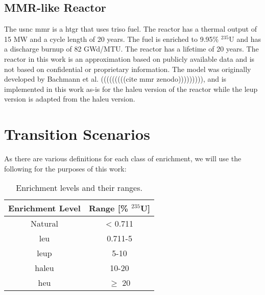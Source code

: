 \subsection{MMR-like Reactor}
\label{sec:mmr}

The \gls{usnc} \gls{mmr} is a \gls{htgr} that uses \gls{triso} fuel. The reactor has a thermal output of 15 MW and a cycle length of 20 years. The fuel is enriched to 9.95\% $^{235}$U and has a discharge burnup of 82 GWd/MTU. The reactor has a lifetime of 20 years. The reactor in this work is an approximation based on publicly available data and is not based on confidential or proprietary information. The model was originally developed by Bachmann et al. (((((((((cite mmr zenodo))))))))), and is implemented in this work as-is for the \gls{haleu} version of the reactor while the \gls{leup} version is adapted from the \gls{haleu} version.



\section{Transition Scenarios}
\label{sec:transition_scenarios}

As there are various definitions for each class of enrichment, we will use the following for the purposes of this work:

\begin{table}[htbp]
   \centering
   \caption{Enrichment levels and their ranges.}
   \label{tab:enrichment_levels}
   \begin{tabular}{c c}
      \hline
      \textbf{Enrichment Level} & \textbf{Range [\%  $^{235}$U]} \\
      \hline
      Natural & < 0.711 \\
      \gls{leu} & 0.711-5 \\
      \gls{leup} & 5-10 \\
      \gls{haleu} & 10-20 \\
      \gls{heu} & $\geq$ 20  \\
      \hline
   \end{tabular}
\end{table}



